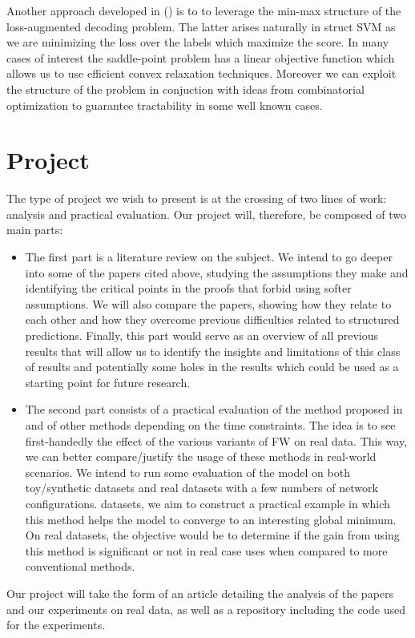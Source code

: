 \documentclass{article}
\begin{document}
Another approach developed in (\cite{dualextraSimon}) is to to leverage the
min-max structure of the loss-augmented decoding problem. The latter arises
naturally in struct SVM as we are minimizing the loss over the labels which
maximize the score. In many cases of interest the saddle-point problem has a
linear objective function which allows us to use efficient convex relaxation
techniques. Moreover we can exploit the structure of the problem in conjuction
with ideas from combinatorial optimization to guarantee tractability in some
well known cases.

\section*{Project}
The type of project we wish to present is at the crossing of two lines of work:
analysis and practical evaluation. Our project will, therefore, be composed of
two main parts:
\begin{itemize}
    \item The first part is a literature review on the subject. We intend to go
deeper into some of the papers cited above, studying the assumptions they make
and identifying the critical points in the proofs that forbid using softer
assumptions. We will also compare the papers, showing how they relate to each
other and how they overcome previous difficulties related to structured
predictions. Finally, this part would serve as an overview of all previous
results that will allow us to identify the insights and limitations of this
class of results and potentially some holes in the results which could be used
as a starting point for future research.
    \item The second part consists of a practical evaluation of the method
proposed in and of other methods depending on the time constraints. The idea is
to see first-handedly the effect of the various variants of FW on real data.
This way, we can better compare/justify the usage of these methods in real-world
scenarios. We intend to run some evaluation of the model on both toy/synthetic
datasets and real datasets with a few numbers of network configurations. %
datasets, we aim to construct a practical example in which this method helps the
model to converge to an interesting global minimum. On real datasets, the
objective would be to determine if the gain from using this method is
significant or not in real case uses when compared to more conventional methods.
\end{itemize}


Our project will take the form of an article detailing the analysis of the
papers and our experiments on real data, as well as a repository including the
code used for the experiments.

\nocite{*}
\printbibliography
\end{document}
